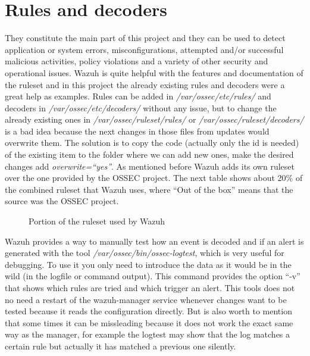 \section{Rules and decoders}
They constitute the main part of this project and they can be used to detect application or system errors, misconfigurations, attempted and/or successful malicious activities, policy violations and a variety of other security and operational issues\cite{wazuh_index}. Wazuh is quite helpful with the features and documentation of the ruleset and in this project the already existing rules and decoders were a great help as examples.
\linej
\linej
Rules can be added in \textit{/var/ossec/etc/rules/} and decoders in \textit{/var/ossec/etc/decoders/} without any issue, but to change the already existing ones in \textit{/var/ossec/ruleset/rules/} or \textit{/var/ossec/ruleset/decoders/} is a bad idea because the next changes in those files from updates would overwrite them. The solution is to copy the code (actually only the id is needed) of the existing item to the folder where we can add new ones, make the desired changes add \textit{overwrite=``yes''}\cite{wazuh_custom}.
\linej
\linej
As mentioned before Wazuh adds its own ruleset over the one provided by the OSSEC project. The next table shows about 20\% of the combined ruleset that Wazuh uses, where ``Out of the box'' means that the source was the OSSEC project.
\begin{figure}[H]
  \centering
	\caption{Portion of the ruleset used by Wazuh\cite{wazuh_ossec_ruleset}}
\end{figure}
\linej
Wazuh provides a way to manually test how an event is decoded and if an alert is generated with the tool \textit{/var/ossec/bin/ossec-logtest}\cite{wazuh_testing}, which is very useful for debugging. To use it you only need to introduce the data as it would be in the wild (in the logfile or command output). This command provides the option ``-v'' that shows which rules are tried and which trigger an alert. This tools does not no need a restart of the wazuh-manager service whenever changes want to be tested because it reads the configuration directly. But is also worth to mention that some times it can be missleading because it does not work the exact same way as the manager, for example the logtest may show that the log matches a certain rule but actually it has matched a previous one silently.

